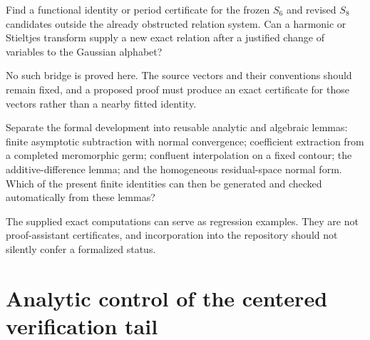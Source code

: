 \begin{question}
Find a functional identity or period certificate for the frozen $S_6$
and revised $S_8$ candidates outside the already obstructed relation
system. Can a harmonic or Stieltjes transform supply a new exact
relation after a justified change of variables to the Gaussian alphabet?
\end{question}
No such bridge is proved here. The source vectors and their conventions
should remain fixed, and a proposed proof must produce an exact
certificate for those vectors rather than a nearby fitted identity.

\begin{question}
Separate the formal development into reusable analytic and algebraic
lemmas: finite asymptotic subtraction with normal convergence;
coefficient extraction from a completed meromorphic germ; confluent
interpolation on a fixed contour; the additive-difference lemma; and
the homogeneous residual-space normal form. Which of the present
finite identities can then be generated and checked automatically from
these lemmas?
\end{question}
The supplied exact computations can serve as regression examples. They
are not proof-assistant certificates, and incorporation into the
repository should not silently confer a formalized status.

\appendix
\section{Analytic control of the centered verification tail}

